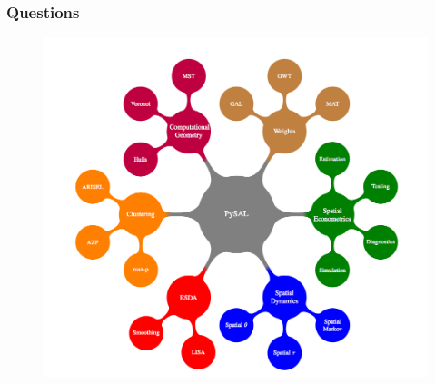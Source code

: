 \documentclass[nototal]{beamer}
\begin{document}
\begin{frame}
	\frametitle{Questions}
  \begin{center}
 \begin{figure}[htbp]
 \includegraphics[width=0.60\linewidth]{pysalgraphic.png}
 \end{figure}
  {}\\
  {}
 \end{center}
 \end{frame} 


\section{} 


\section{}
\end{document}
